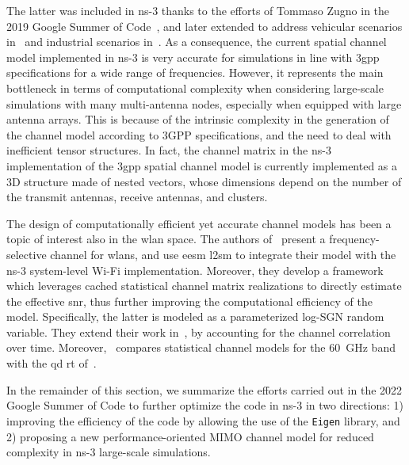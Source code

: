 The latter was included in ns-3 thanks to the efforts of Tommaso Zugno in the 2019 Google Summer of Code~\cite{tommaso:20}, and later extended to address vehicular scenarios in~\cite{10.1145/3460797.3460801} and industrial scenarios in~\cite{10.1145/3532577.3532596}. 
As a consequence, the current spatial channel model implemented in ns-3 is very accurate for simulations in line with \gls{3gpp} specifications for a wide range of frequencies. However, it represents the main bottleneck in terms of computational complexity when considering large-scale simulations with many multi-antenna nodes, especially when equipped with large antenna arrays. This is because of the intrinsic complexity in the generation of the channel model according to 3GPP specifications, and the need to deal with inefficient tensor structures. In fact, the channel matrix in the ns-3 implementation of the \gls{3gpp} spatial channel model is currently implemented as a 3D structure made of nested vectors, whose dimensions depend on the number of the transmit antennas, receive antennas, and clusters. %

The design of computationally efficient yet accurate channel models has been a topic of interest also in the \gls{wlan} space. The authors of~\cite{jin2020efficient, jin2021efficient} present a frequency-selective channel for \glspl{wlan}, and use \gls{eesm} \gls{l2sm} to integrate their model with the ns-3 system-level Wi-Fi implementation. Moreover, they develop a framework which leverages cached statistical channel matrix realizations to directly estimate the effective \gls{snr}, thus further improving the computational efficiency of the model. Specifically, the latter is modeled as a parameterized log-SGN random variable. They extend their work in~\cite{jin2021eesm}, by accounting for the channel correlation over time. 
Moreover,~\cite{liu2021performance} compares statistical channel models for the 60~GHz band with the \gls{qd} \gls{rt} of~\cite{QD}.

In the remainder of this section, we summarize the efforts carried out in the 2022 Google Summer of Code to further optimize the code in ns-3 in two directions: 1) improving the efficiency of the code by allowing the use of the \texttt{Eigen} library, and 2) proposing a new performance-oriented MIMO channel model for reduced complexity in ns-3 large-scale simulations. 


